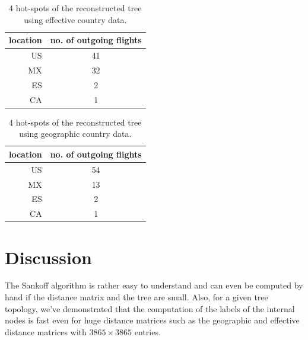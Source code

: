 \documentclass{article}
\begin{document}
\begin{table}[h!]
\centering
\begin{tabular}{r|c}
location & no. of outgoing flights \\
\hline
US       & 41                      \\
MX       & 32                      \\
ES       & 2                       \\
CA       & 1                                      
\end{tabular}
\caption{4 hot-spots of the reconstructed tree using effective country data.}
\label{tab: hotspots country effective}
\end{table}

\begin{table}[h!]
\centering
\begin{tabular}{r|c}
location & no. of outgoing flights \\
\hline
US       & 54                      \\
MX       & 13                      \\
ES       & 2                       \\
CA       & 1                       
\end{tabular}
\caption{4 hot-spots of the reconstructed tree using geographic country data.}
\label{tab: hotspots country geographic}
\end{table}



\section{Discussion}
The Sankoff algorithm is rather easy to understand and can even be computed by
hand if the distance matrix and the tree are small. Also, for a given tree
topology, we've demonstrated that the computation of the labels of the internal
nodes is fast even for huge distance matrices such as the geographic and
effective distance matrices with $3865 \times 3865$ entries.
\end{document}
